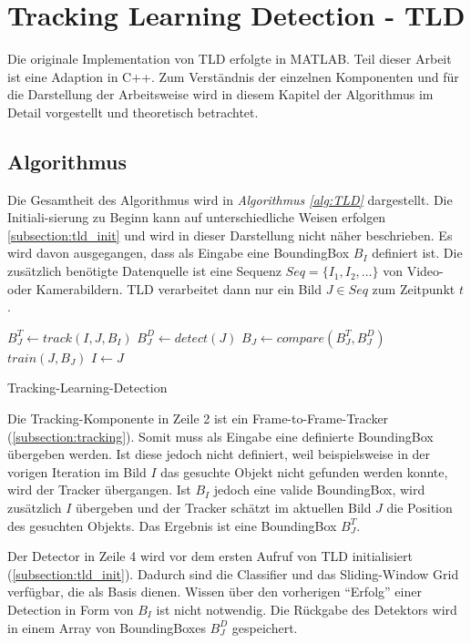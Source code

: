 \section{Tracking Learning Detection - TLD}
	\label{section_3}
	Die originale Implementation von TLD erfolgte in MATLAB. Teil dieser Arbeit ist eine Adaption in C++. Zum Verständnis der einzelnen Komponenten und für die Darstellung der Arbeitsweise wird in diesem Kapitel der Algorithmus im Detail vorgestellt und theoretisch betrachtet.

	\subsection{Algorithmus}
	Die Gesamtheit des Algorithmus wird in {\em Algorithmus \ref{alg:TLD}} dargestellt. Die Initiali-sierung zu Beginn kann auf unterschiedliche Weisen erfolgen \ref{subsection:tld_init} und wird in dieser Darstellung nicht näher beschrieben. Es wird davon ausgegangen, dass als Eingabe eine BoundingBox $B_I$ definiert ist. Die zusätzlich benötigte Datenquelle ist eine Sequenz $Seq = \{I_1, I_2, \dots \}$ von Video- oder Kamerabildern. TLD verarbeitet dann nur ein Bild $J \in Seq$ zum Zeitpunkt $t$.

	\begin{algorithm}[H]
		\vspace{0.2cm}
		 {
			$B_J^T \leftarrow track(I,J,B_I)$\;
		}
		$B_J^D \leftarrow detect(J)$\;
		$B_J \leftarrow compare(B_J^T,B_J^D)$\;
		 {
			$train(J,B_J)$\;
		}
		$I \leftarrow J$\;
		\caption{Tracking-Learning-Detection}
		\label{alg:TLD}
		\vspace{0.2cm}
	\end{algorithm}
	Die Tracking-Komponente in Zeile 2 ist ein Frame-to-Frame-Tracker (\ref{subsection:tracking}). Somit muss als Eingabe eine definierte BoundingBox übergeben werden. Ist diese jedoch nicht definiert, weil beispielsweise in der vorigen Iteration im Bild $I$ das gesuchte Objekt nicht gefunden werden konnte, wird der Tracker übergangen. Ist $B_I$ jedoch eine valide BoundingBox, wird zusätzlich $I$ übergeben und der Tracker schätzt im aktuellen Bild $J$ die Position des gesuchten Objekts. Das Ergebnis ist eine BoundingBox $B_J^T$.

	Der Detector in Zeile 4 wird vor dem ersten Aufruf von TLD initialisiert (\ref{subsection:tld_init}). Dadurch sind die Classifier und das Sliding-Window Grid verfügbar, die als Basis dienen. Wissen über den vorherigen ``Erfolg'' einer Detection in Form von $B_I$ ist nicht notwendig. Die Rückgabe des Detektors wird in einem Array von BoundingBoxes $B_J^D$ gespeichert.

